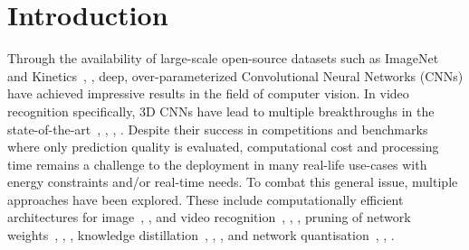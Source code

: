 \documentclass[runningheads]{llncs}
\begin{document}
%
 \section{Introduction} \label{sec:introduction}




Through the availability of large-scale open-source datasets such as ImageNet~\cite{russakovsky2015imagenet} and Kinetics~\cite{kay2017kinetics}, \cite{carreira2018kinetics},
deep, over-parameterized Convolutional Neural Networks (CNNs) have achieved impressive results in the field of computer vision.
In video recognition specifically, 3D CNNs have lead to multiple breakthroughs in the state-of-the-art~\cite{carreira2017quo}, \cite{tran2018closer}, \cite{feichtenhofer2019slowfast}, \cite{feichtenhofer2020x3d}. Despite their success in competitions and benchmarks where only prediction quality is evaluated, computational cost and processing time remains a challenge to the deployment in many real-life use-cases with energy constraints and/or real-time needs.
To combat this general issue, multiple approaches have been explored.
These include computationally efficient architectures for image~\cite{howard2017mobilenet}, \cite{zhang2018shufflenet}, \cite{mingxing2019efficientnet} 
and video recognition~\cite{kopulku2019resource}, \cite{feichtenhofer2020x3d}, \cite{zhu2020faster},
pruning of network weights~\cite{chen2015compressing}, \cite{han2015deep}, \cite{he2017channel},
knowledge distillation~\cite{hinton2015distilling}, \cite{yim2017gift}, \cite{passalis2018learning},
and 
network quantisation~\cite{hubara2016binarized}, \cite{cai2017quantisation}, \cite{floropoulos2019complete}.
\end{document}
